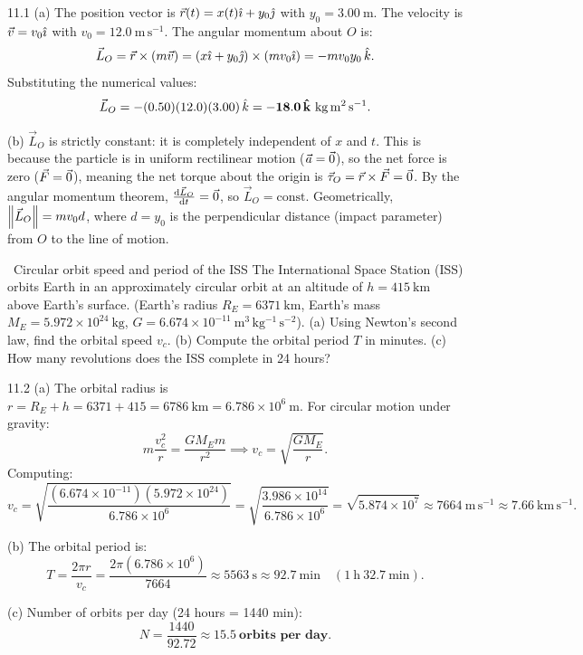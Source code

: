 \begin{solution}{11.1}
(a) The position vector is $\vec{r}(t) = x(t)\hat{\imath} + y_0\hat{\jmath}$ with $y_0 = 3.00\ \mathrm{m}$.
The velocity is $\vec{v} = v_0\hat{\imath}$ with $v_0 = 12.0\ \mathrm{m\,s^{-1}}$.
The angular momentum about $O$ is:
\[
\vec{L}_O = \vec{r}\times(m\vec{v}) = (x\hat{\imath} + y_0\hat{\jmath})\times(m v_0\hat{\imath}) = -m v_0 y_0\,\hat{k}.
\]
Substituting the numerical values:
\[
\vec{L}_O = -(0.50)(12.0)(3.00)\,\hat{k} = \mathbf{-18.0\,\hat{k}\ \mathrm{kg\,m^2\,s^{-1}}.}
\]

(b) $\vec{L}_O$ is strictly constant: it is completely independent of $x$ and $t$.
This is because the particle is in uniform rectilinear motion ($\vec{a} = \vec{0}$), so the net force is zero ($\vec{F} = \vec{0}$), meaning the net torque about the origin is $\vec{\tau}_O = \vec{r}\times\vec{F} = \vec{0}$. By the angular momentum theorem, $\frac{\mathrm{d}\vec{L}_O}{\mathrm{d} t} = \vec{0}$, so $\vec{L}_O = \text{const}$. Geometrically, $\left\lVert \vec{L}_O \right\rVert = m v_0 d$, where $d = y_0$ is the perpendicular distance (impact parameter) from $O$ to the line of motion.
\end{solution}

\begin{exercise}{\warm\ Circular orbit speed and period of the ISS}
The International Space Station (ISS) orbits Earth in an approximately circular orbit at an altitude of $h = 415\ \mathrm{km}$ above Earth's surface.
(Earth's radius $R_E = 6371\ \mathrm{km}$, Earth's mass $M_E = 5.972\times 10^{24}\ \mathrm{kg}$, $G = 6.674\times 10^{-11}\ \mathrm{m^3\,kg^{-1}\,s^{-2}}$).
(a) Using Newton's second law, find the orbital speed $v_c$.
(b) Compute the orbital period $T$ in minutes.
(c) How many revolutions does the ISS complete in 24 hours?
\end{exercise}

\begin{tabletworkspace}[5.5cm]
\end{tabletworkspace}

\begin{solution}{11.2}
(a) The orbital radius is $r = R_E + h = 6371 + 415 = 6786\ \mathrm{km} = 6.786\times 10^6\ \mathrm{m}$.
For circular motion under gravity:
\[
m\frac{v_c^2}{r} = \frac{GM_E m}{r^2} \implies \boxed{v_c = \sqrt{\frac{GM_E}{r}}.}
\]
Computing:
\[
v_c = \sqrt{\frac{(6.674\times 10^{-11})(5.972\times 10^{24})}{6.786\times 10^6}} = \sqrt{\frac{3.986\times 10^{14}}{6.786\times 10^6}} = \sqrt{5.874\times 10^7} \approx 7664\ \mathrm{m\,s^{-1}} \approx \mathbf{7.66\ \mathrm{km\,s^{-1}}.}
\]

(b) The orbital period is:
\[
T = \frac{2\pi r}{v_c} = \frac{2\pi(6.786\times 10^6)}{7664} \approx 5563\ \mathrm{s} \approx \mathbf{92.7\ \mathrm{min}} \quad (1\ \mathrm{h}\ 32.7\ \mathrm{min}).
\]

(c) Number of orbits per day (24 hours = 1440 min):
\[
N = \frac{1440}{92.72} \approx \mathbf{15.5\ \text{orbits per day}}.
\]
\end{solution}

